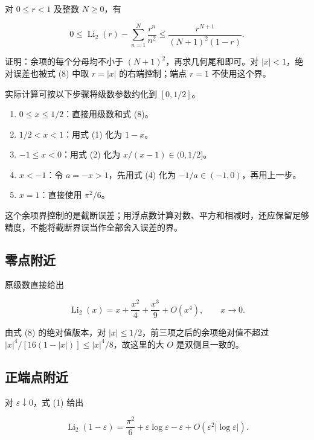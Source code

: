 \documentclass[11pt,a4paper]{article}
\providecommand{\tightlist}{\setlength{\itemsep}{3pt}\setlength{\parskip}{0pt}}
\begin{document}
对 \(0\leqslant r<1\) 及整数 \(N\geqslant0\)，有

\begin{equation}
0\leqslant\operatorname{Li}_2(r)-\sum_{n=1}^N\frac{r^n}{n^2}
\leqslant\frac{r^{N+1}}{(N+1)^2(1-r)}.
\tag{8}
\end{equation}

证明：余项的每个分母均不小于 \((N+1)^2\)，再求几何尾和即可。对 \(|x|<1\)，绝对误差也被式 (8) 中取 \(r=|x|\) 的右端控制；端点 \(r=1\) 不使用这个界。

实际计算可按以下步骤将级数参数约化到 \([0,1/2]\)。

\begin{enumerate}
\def\labelenumi{\arabic{enumi}.}
\tightlist
\item
  \(0\leqslant x\leqslant1/2\)：直接用级数和式 (8)。
\item
  \(1/2<x<1\)：用式 (1) 化为 \(1-x\)。
\item
  \(-1\leqslant x<0\)：用式 (2) 化为 \(x/(x-1)\in(0,1/2]\)。
\item
  \(x<-1\)：令 \(a=-x>1\)，先用式 (4) 化为 \(-1/a\in(-1,0)\)，再用上一步。
\item
  \(x=1\)：直接使用 \(\pi^2/6\)。
\end{enumerate}

这个余项界控制的是截断误差；用浮点数计算对数、平方和相减时，还应保留足够精度，不能将截断界误当作全部舍入误差的界。

\hypertarget{ux96f6ux70b9ux9644ux8fd1}{%
\subsection{零点附近}\label{ux96f6ux70b9ux9644ux8fd1}}

原级数直接给出

\[
\operatorname{Li}_2(x)=x+\frac{x^2}{4}+\frac{x^3}{9}+O(x^4),
\qquad x\to0.
\]

由式 (8) 的绝对值版本，对 \(|x|\leqslant1/2\)，前三项之后的余项绝对值不超过 \(|x|^4/[16(1-|x|)]\leqslant|x|^4/8\)，故这里的大 \(O\) 是双侧且一致的。

\hypertarget{ux6b63ux7aefux70b9ux9644ux8fd1}{%
\subsection{正端点附近}\label{ux6b63ux7aefux70b9ux9644ux8fd1}}

对 \(\varepsilon\downarrow0\)，式 (1) 给出

\[
\operatorname{Li}_2(1-\varepsilon)
=\frac{\pi^2}{6}+\varepsilon\log\varepsilon-\varepsilon
+O\!\left(\varepsilon^2|\log\varepsilon|\right).
\]
\end{document}
